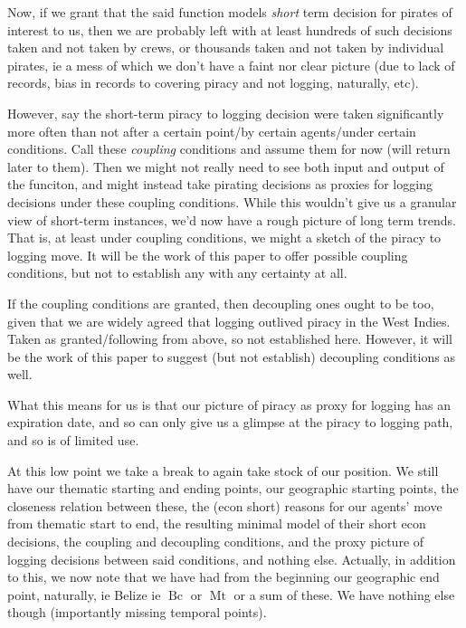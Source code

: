 \documentclass{amsart}
\DeclareMathOperator{\mt}{Mt}%
\DeclareMathOperator{\bc}{Bc}%
\theoremstyle{definition}%
\theoremstyle{definition}%
\theoremstyle{remark}%
\begin{document}
Now, if we grant that the said function models \emph{short} term decision for pirates of interest to us, then we are probably left with at least hundreds of such decisions taken and not taken by crews, or thousands taken and not taken by individual pirates, ie a mess of which we don't have a faint nor clear picture (due to lack of records, bias in records to covering piracy and not logging, naturally, etc).

However, say the short-term piracy to logging decision were taken significantly more often than not after a certain point/by certain agents/under certain conditions. Call these \emph{coupling} conditions %
and assume them for now (will return later to them). Then we might not really need to see both input and output of the funciton, and might instead take pirating decisions as proxies for logging decisions under these coupling conditions. While this wouldn't give us a granular view of short-term instances, we'd now have a rough picture of long term trends. That is, at least under coupling conditions, we might a sketch of the piracy to logging move. It will be the work of this paper to offer possible coupling conditions, but not to establish any with any certainty at all.

If the coupling conditions are granted, then decoupling ones ought to be too, given that we are widely agreed that logging outlived piracy in the West Indies. Taken as granted/following from above, so not established here. However, it will be the work of this paper to suggest (but not establish) decoupling conditions as well.

What this means for us is that our picture of piracy as proxy for logging has an expiration date, and so can only give us a glimpse at the piracy to logging path, and so is of limited use.

At this low point we take a break to again take stock of our position. We still have our thematic starting and ending points, our geographic starting points, the closeness relation between these, the (econ short) reasons for our agents' move from thematic start to end, the resulting minimal model of their short econ decisions, the coupling and decoupling conditions, and the proxy picture of logging decisions between said conditions, and nothing else. Actually, in addition to this, we now note that we have had from the beginning our geographic end point, naturally, ie Belize ie \(\bc\) or \(\mt\) or a sum of these. We have nothing else though (importantly missing temporal points).
\end{document}
